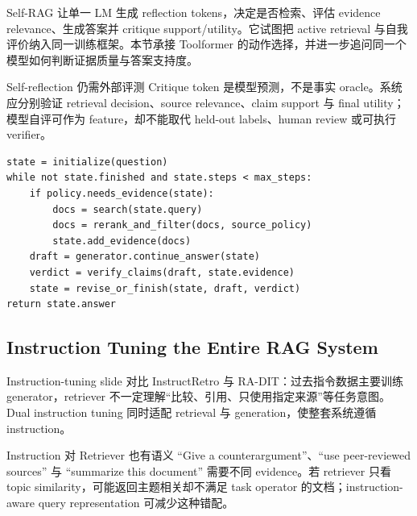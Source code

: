 Self-RAG 让单一 LM 生成 reflection tokens，决定是否检索、评估 evidence relevance、生成答案并 critique support/utility。它试图把 active retrieval 与自我评价纳入同一训练框架。本节承接 Toolformer 的动作选择，并进一步追问同一个模型如何判断证据质量与答案支持度。


\begin{importantbox}{Self-reflection 仍需外部评测}
Critique token 是模型预测，不是事实 oracle。系统应分别验证 retrieval decision、source relevance、claim support 与 final utility；模型自评可作为 feature，却不能取代 held-out labels、human review 或可执行 verifier。
\end{importantbox}

\begin{lstlisting}[caption={Active retrieval 与 evidence verification 循环}]
state = initialize(question)
while not state.finished and state.steps < max_steps:
    if policy.needs_evidence(state):
        docs = search(state.query)
        docs = rerank_and_filter(docs, source_policy)
        state.add_evidence(docs)
    draft = generator.continue_answer(state)
    verdict = verify_claims(draft, state.evidence)
    state = revise_or_finish(state, draft, verdict)
return state.answer
\end{lstlisting}

\subsection{Instruction Tuning the Entire RAG System}

Instruction-tuning slide 对比 InstructRetro 与 RA-DIT：过去指令数据主要训练 generator，retriever 不一定理解“比较、引用、只使用指定来源”等任务意图。Dual instruction tuning 同时适配 retrieval 与 generation，使整套系统遵循 instruction。


\begin{knowledgebox}{Instruction 对 Retriever 也有语义}
``Give a counterargument''、``use peer-reviewed sources'' 与 ``summarize this document'' 需要不同 evidence。若 retriever 只看 topic similarity，可能返回主题相关却不满足 task operator 的文档；instruction-aware query representation 可减少这种错配。
\end{knowledgebox}

